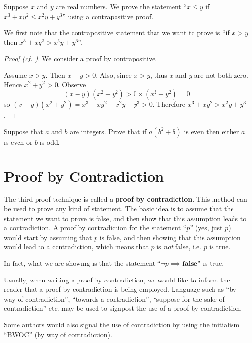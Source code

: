 \begin{example}
    Suppose $x$ and $y$ are real numbers. We prove the statement ``$x \leq y$ if $x^3 + xy^2 \leq x^2y + y^3$'' using a contrapositive proof.

    We first note that the contrapositive statement that we want to prove is ``if $x > y$ then $x^3 + xy^2 > x^2y + y^3$''.

    \begin{proof}[Proof (cf. {\cite[p.~130]{hammack_2018}})]
        We consider a proof by contrapositive.

        Assume $x > y$. Then $x - y > 0$. Also, since $x > y$, thus $x$ and $y$ are not both zero. Hence $x^2 + y^2 > 0$.
        Observe
        \[
            (x-y)(x^2+y^2) > 0 \times (x^2+y^2) = 0
        \]
        so $(x-y)(x^2+y^2) = x^3 + xy^2 - x^2y - y^3 > 0$. Therefore $x^3 + xy^2 > x^2y + y^3$.
    \end{proof}
\end{example}

\begin{exercise}
    Suppose that $a$ and $b$ are integers. Prove that if $a(b^2 + 5)$ is even then either $a$ is even or $b$ is odd.
\end{exercise}

\section{Proof by Contradiction}
The third proof technique is called a \textbf{proof by contradiction}. This method can be used to prove any kind of statement. The basic idea is to assume that the statement we want to prove is false, and then show that this assumption leads to a contradiction. A proof by contradiction for the statement ``$p$'' (yes, just $p$) would start by assuming that $p$ is false, and then showing that this assumption would lead to a contradiction, which means that $p$ is \textit{not} false, i.e. $p$ is true.
\begin{remark}
    In fact, what we are showing is that the statement ``$\lnot p \implies \textbf{false}$'' is true.
\end{remark}

Usually, when writing a proof by contradiction, we would like to inform the reader that a proof by contradiction is being employed. Language such as ``by way of contradiction'', ``towards a contradiction'', ``suppose for the sake of contradiction'' etc. may be used to signpost the use of a proof by contradiction.
\begin{remark}
    Some authors would also signal the use of contradiction by using the initialism ``BWOC'' (by way of contradiction).
\end{remark}


